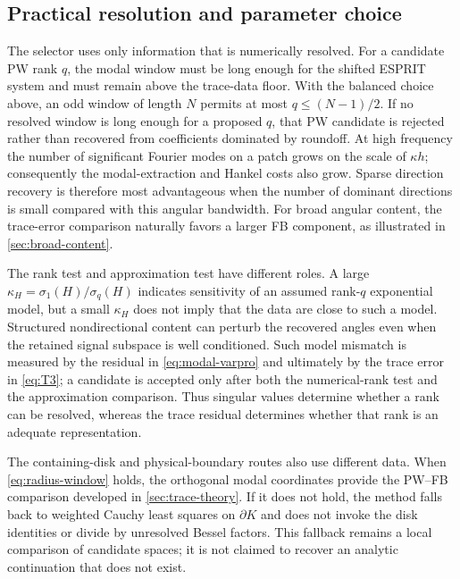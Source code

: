 \documentclass[11pt]{article}
\numberwithin{equation}{section}
\begin{document}
\subsection{Practical resolution and parameter choice}\label{sec:practical-resolution}
The selector uses only information that is numerically resolved.  For a candidate PW rank $q$, the modal window must be long enough for the shifted ESPRIT system and must remain above the trace-data floor.  With the balanced choice above, an odd window of length $N$ permits at most $q\le(N-1)/2$.  If no resolved window is long enough for a proposed $q$, that PW candidate is rejected rather than recovered from coefficients dominated by roundoff.  At high frequency the number of significant Fourier modes on a patch grows on the scale of $\kappa h$; consequently the modal-extraction and Hankel costs also grow.  Sparse direction recovery is therefore most advantageous when the number of dominant directions is small compared with this angular bandwidth.  For broad angular content, the trace-error comparison naturally favors a larger FB component, as illustrated in \cref{sec:broad-content}.

The rank test and approximation test have different roles.  A large $\kappa_H=\sigma_1(H)/\sigma_q(H)$ indicates sensitivity of an assumed rank-$q$ exponential model, but a small $\kappa_H$ does not imply that the data are close to such a model.  Structured nondirectional content can perturb the recovered angles even when the retained signal subspace is well conditioned.  Such model mismatch is measured by the residual in \eqref{eq:modal-varpro} and ultimately by the trace error in \eqref{eq:T3}; a candidate is accepted only after both the numerical-rank test and the approximation comparison.  Thus singular values determine whether a rank can be resolved, whereas the trace residual determines whether that rank is an adequate representation.

The containing-disk and physical-boundary routes also use different data.  When \eqref{eq:radius-window} holds, the orthogonal modal coordinates provide the PW--FB comparison developed in \cref{sec:trace-theory}.  If it does not hold, the method falls back to weighted Cauchy least squares on $\partial K$ and does not invoke the disk identities or divide by unresolved Bessel factors.  This fallback remains a local comparison of candidate spaces; it is not claimed to recover an analytic continuation that does not exist.
\end{document}
